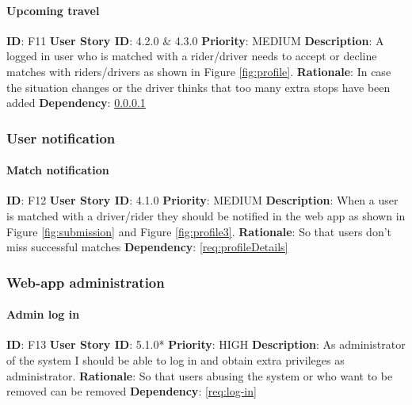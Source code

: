 \documentclass{article}
\begin{document}
\paragraph{Upcoming travel}\label{req:upcomingTravel}
\textbf{ID}: F11\newline
\textbf{User Story ID}: 4.2.0 \& 4.3.0\newline
\textbf{Priority}: MEDIUM\newline
\textbf{Description}: A logged in user who is matched with a rider/driver needs to accept or decline matches with riders/drivers as shown in Figure \ref{fig:profile}. \newline
\textbf{Rationale}: In case the situation changes or the driver thinks that too many extra stops have been added\newline
\textbf{Dependency}: \ref{req:upcomingTravel}\newline

\subsubsection{User notification}

\paragraph{Match notification}\label{req:matchNotification}
\textbf{ID}: F12\newline
\textbf{User Story ID}: 4.1.0\newline
\textbf{Priority}: MEDIUM\newline
\textbf{Description}: When a user is matched with a driver/rider they should be notified in the web app as shown in Figure \ref{fig:submission} and Figure \ref{fig:profile3}. \newline
\textbf{Rationale}: So that users don't miss successful matches\newline
\textbf{Dependency}: \ref{req:profileDetails}\newline

\subsubsection{Web-app administration}

\paragraph{Admin log in}\label{req:adminLog-in}
\textbf{ID}: F13\newline
\textbf{User Story ID}: 5.1.0*\newline
\textbf{Priority}: HIGH\newline
\textbf{Description}: As administrator of the system I should be able to log in and obtain extra privileges as administrator. \newline
\textbf{Rationale}: So that users abusing the system or who want to be removed can be removed\newline
\textbf{Dependency}: \ref{req:log-in}\newline
\end{document}
